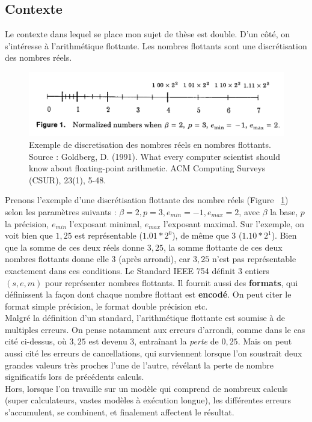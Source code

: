 \documentclass[a4paper,11pt]{article}
\begin{document}
\subsection{Contexte}
Le contexte dans lequel se place mon sujet de thèse est double.
D’un côté, on s’intéresse à l’arithmétique flottante. Les nombres flottants sont une discrétisation des nombres réels. 
\begin{figure}
  \begin{center}
    \includegraphics[width=12cm]{Floating_point_numbers_discretization}
    \caption{Exemple de discretisation des nombres réels en nombres flottants. Source : Goldberg, D. (1991). What every computer scientist should know about floating-point arithmetic. ACM Computing Surveys (CSUR), 23(1), 5-48.}
    \label{discretization}
  \end{center}
\end{figure}
Prenons l'exemple d'une discrétisation flottante des nombre réels (Figure ~\ref{discretization}) selon les paramètres suivants : $\beta=2, p=3, e_{min}=-1,e_{max}=2$, avec $\beta$ la base, $p$ la précision, $e_{min}$ l'exposant minimal, $e_{max}$ l'exposant maximal.
Sur l'exemple, on voit bien que $1,25$ est représentable ($1.01*2^{0}$), de même que $3$ ($1.10*2^{1}$). Bien que la somme de ces deux réels donne $3,25$, la somme flottante de ces deux nombres flottants donne elle $3$ (après arrondi), car $3,25$ n'est pas représentable exactement dans ces conditions.
Le Standard IEEE 754 définit 3 entiers $(s,e,m)$ pour représenter nombres flottants. Il fournit aussi des \textbf{formats}, qui définissent la façon dont chaque nombre flottant est \textbf{encodé}. On peut citer le format simple précision, le format double précision etc. \\
Malgré la définition d'un standard, l'arithmétique flottante est soumise à de multiples erreurs. On pense notamment aux erreurs d'arrondi, comme dans le cas cité ci-dessus, où $3,25$ est devenu $3$, entraînant la \textit{perte} de $0,25$. Mais on peut aussi cité les erreurs de cancellations, qui surviennent lorsque l'on soustrait deux grandes valeurs très proches l'une de l'autre, révélant la perte de nombre significatifs lors de précédents calculs. \\ %
Hors, lorsque l’on travaille sur un modèle qui comprend de nombreux calculs (super calculateurs, vastes modèles à exécution longue), les différentes erreurs s’accumulent, se combinent, et finalement affectent le résultat.
\end{document}
